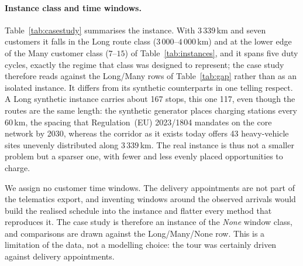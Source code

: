 \paragraph{Instance class and time windows.}
Table~\ref{tab:casestudy} summarises the instance.  With $3\,339$\,km and seven
customers it falls in the Long route class ($3\,000$--$4\,000$\,km) and at the
lower edge of the Many customer class ($7$--$15$) of
Table~\ref{tab:instances}, and it spans five duty cycles, exactly the regime
that class was designed to represent; the case study therefore reads against
the Long/Many rows of Table~\ref{tab:gap} rather than as an isolated instance.
It differs from its synthetic counterparts in one telling respect.  A Long
synthetic instance carries about 167 stops, this one 117, even though the
routes are the same length: the synthetic generator places charging stations
every 60\,km, the spacing that Regulation~(EU) 2023/1804 mandates on the
core network by 2030, whereas the corridor as it exists today offers 43
heavy-vehicle sites unevenly distributed along $3\,339$\,km.  The real instance
is thus not a smaller problem but a sparser one, with fewer and less evenly
placed opportunities to charge.

We assign no customer time windows.  The delivery appointments are not part of
the telematics export, and inventing windows around the observed arrivals
would build the realised schedule into the instance and flatter every method
that reproduces it.  The case study is therefore an instance of the
\emph{None} window class, and comparisons are drawn against the Long/Many/None
row.  This is a limitation of the data, not a modelling choice: the tour was
certainly driven against delivery appointments.

